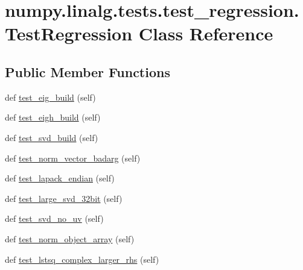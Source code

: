 \hypertarget{classnumpy_1_1linalg_1_1tests_1_1test__regression_1_1TestRegression}{}\section{numpy.\+linalg.\+tests.\+test\+\_\+regression.\+Test\+Regression Class Reference}
\label{classnumpy_1_1linalg_1_1tests_1_1test__regression_1_1TestRegression}
\subsection*{Public Member Functions}
\begin{DoxyCompactItemize}
\item 
def \hyperlink{classnumpy_1_1linalg_1_1tests_1_1test__regression_1_1TestRegression_ac888c3a017031d0eddb04c72b04687d5}{test\+\_\+eig\+\_\+build} (self)
\item 
def \hyperlink{classnumpy_1_1linalg_1_1tests_1_1test__regression_1_1TestRegression_a49f2086e0f6a1215f8bf57c80e5a9ea8}{test\+\_\+eigh\+\_\+build} (self)
\item 
def \hyperlink{classnumpy_1_1linalg_1_1tests_1_1test__regression_1_1TestRegression_a929b4ce5f87a527f0ffad408b8794878}{test\+\_\+svd\+\_\+build} (self)
\item 
def \hyperlink{classnumpy_1_1linalg_1_1tests_1_1test__regression_1_1TestRegression_ae6be6a0b4dc78f6c7ebdba875489deaa}{test\+\_\+norm\+\_\+vector\+\_\+badarg} (self)
\item 
def \hyperlink{classnumpy_1_1linalg_1_1tests_1_1test__regression_1_1TestRegression_a6fa4d6dac24fb40f0cd8a3a0a421b1e5}{test\+\_\+lapack\+\_\+endian} (self)
\item 
def \hyperlink{classnumpy_1_1linalg_1_1tests_1_1test__regression_1_1TestRegression_abade48b7d7ce54b68a99e970cb4238bc}{test\+\_\+large\+\_\+svd\+\_\+32bit} (self)
\item 
def \hyperlink{classnumpy_1_1linalg_1_1tests_1_1test__regression_1_1TestRegression_a625af8dfa8e0710dff5a29c43cc7770f}{test\+\_\+svd\+\_\+no\+\_\+uv} (self)
\item 
def \hyperlink{classnumpy_1_1linalg_1_1tests_1_1test__regression_1_1TestRegression_af0efac97a4f4b8c109fcd09f76b4a7d3}{test\+\_\+norm\+\_\+object\+\_\+array} (self)
\item 
def \hyperlink{classnumpy_1_1linalg_1_1tests_1_1test__regression_1_1TestRegression_aa50417effaba2fd0c28add895056a27e}{test\+\_\+lstsq\+\_\+complex\+\_\+larger\+\_\+rhs} (self)
\end{DoxyCompactItemize}


